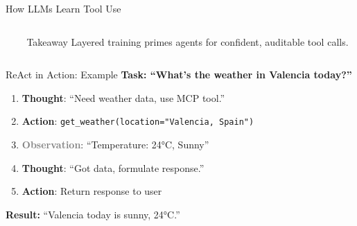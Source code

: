 \documentclass[aspectratio=169]{beamer}
\begin{document}
\begin{frame}{How LLMs Learn Tool Use}
\begin{columns}[T]
\begin{column}{0.62\textwidth}
    \end{column}
    \begin{column}{0.35\textwidth}
      \begin{block}{Takeaway}
        \footnotesize
        Layered training primes agents for confident, auditable tool calls.
      \end{block}
    \end{column}
  \end{columns}
\end{frame}

\begin{frame}{ReAct in Action: Example}
  \centering
  \large\bfseries
  Task: ``What's the weather in Valencia today?''

  \vspace{0.5cm}
  \normalsize

  \begin{enumerate}
    \item \textcolor{conesaTeal}{\textbf{Thought}}: ``Need weather data, use MCP tool.''
    
    \vspace{0.3cm}
    
    \item \textcolor{conesaOrange}{\textbf{Action}}: \texttt{get\_weather(location="Valencia, Spain")}
    
    \vspace{0.3cm}
    
    \item \textcolor{gray}{\textbf{Observation}}: ``Temperature: 24°C, Sunny''
    
    \vspace{0.3cm}
    
    \item \textcolor{conesaTeal}{\textbf{Thought}}: ``Got data, formulate response.''
    
    \vspace{0.3cm}
    
    \item \textcolor{conesaOrange}{\textbf{Action}}: Return response to user
  \end{enumerate}

  \vspace{0.5cm}
  \centering
  \textbf{Result:} ``Valencia today is sunny, 24°C.''
\end{frame}
\end{document}

